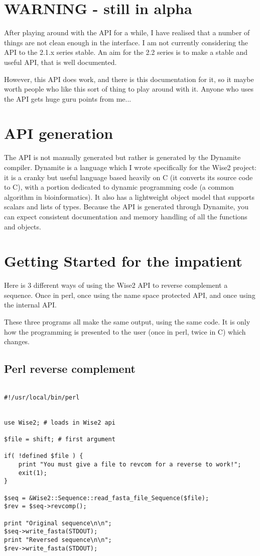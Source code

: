 \section{WARNING - still in alpha}

After playing around with the API for a while, I have realised that
a number of things are not clean enough in the interface. I am not
currently considering the API to the 2.1.x series stable. An aim
for the 2.2 series is to make a stable and useful API, that is
well documented.

However, this API does work, and there is this documentation for it,
so it maybe worth people who like this sort of thing to play around
with it. Anyone who uses the API gets huge guru points from me...
 
\section{API generation}

The API is not manually generated but rather is generated by the
Dynamite compiler. Dynamite is a language which I wrote specifically
for the Wise2 project: it is a cranky but useful language based heavily
on C (it converts its source code to C), with a portion dedicated to
dynamic programming code (a common algorithm in bioinformatics). It also
has a lightweight object model that supports scalars and lists of types.
Because the API is generated through Dynamite, you can expect consistent
documentation and memory handling of all the functions and objects. 

\section{Getting Started for the impatient}

Here is 3 different ways of using the Wise2 API to reverse complement a
sequence. Once in perl, once using the name space protected API, and
once using the internal API.

These three programs all make the same output, using the same code.
It is only how the programming is presented to the user (once in
perl, twice in C) which changes.

\subsection{Perl reverse complement}

\begin{verbatim}

#!/usr/local/bin/perl


use Wise2; # loads in Wise2 api

$file = shift; # first argument

if( !defined $file ) {
    print "You must give a file to revcom for a reverse to work!";
    exit(1);
}

$seq = &Wise2::Sequence::read_fasta_file_Sequence($file);
$rev = $seq->revcomp(); 

print "Original sequence\n\n";
$seq->write_fasta(STDOUT);
print "Reversed sequence\n\n";
$rev->write_fasta(STDOUT);
\end{verbatim}


